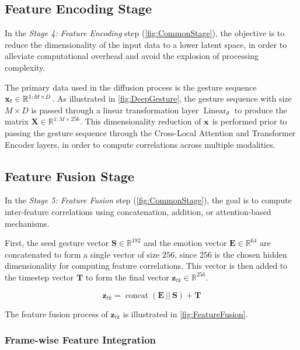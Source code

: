 \subsection{Feature Encoding Stage}

In the \textit{Stage 4: Feature Encoding} step (\autoref{fig:CommonStage}), the objective is to reduce the dimensionality of the input data to a lower latent space, in order to alleviate computational overhead and avoid the explosion of processing complexity.

The primary data used in the diffusion process is the gesture sequence $\mathbf{x}_t \in \mathbb{R}^{1:M \times D}$. As illustrated in \autoref{fig:DeepGesture}, the gesture sequence with size $M \times D$ is passed through a linear transformation layer $\operatorname{Linear}_{\theta}$ to produce the matrix $\mathbf{X} \in \mathbb{R}^{1:M \times 256}$. This dimensionality reduction of $\mathbf{x}$ is performed prior to passing the gesture sequence through the Cross-Local Attention and Transformer Encoder layers, in order to compute correlations across multiple modalities.

\subsection{Feature Fusion Stage}

In the \textit{Stage 5: Feature Fusion} step (\autoref{fig:CommonStage}), the goal is to compute inter-feature correlations using concatenation, addition, or attention-based mechanisms.

First, the seed gesture vector $\mathbf{S} \in \mathbb{R}^{192}$ and the emotion vector $\mathbf{E} \in \mathbb{R}^{64}$ are concatenated to form a single vector of size $256$, since $256$ is the chosen hidden dimensionality for computing feature correlations. This vector is then added to the timestep vector $\mathbf{T}$ to form the final vector $\mathbf{z}_{tk} \in \mathbb{R}^{256}$.


\begin{equation}
	\label{eq:ConditionConcat}
	\mathbf{z}_{tk} = \operatorname{concat }(\mathbf{E}\ || \  \mathbf{S}) + \mathbf{T}
\end{equation}

The feature fusion process of $\mathbf{z}_{tk}$ is illustrated in \autoref{fig:FeatureFusion}.

\subsubsection{Frame-wise Feature Integration}

